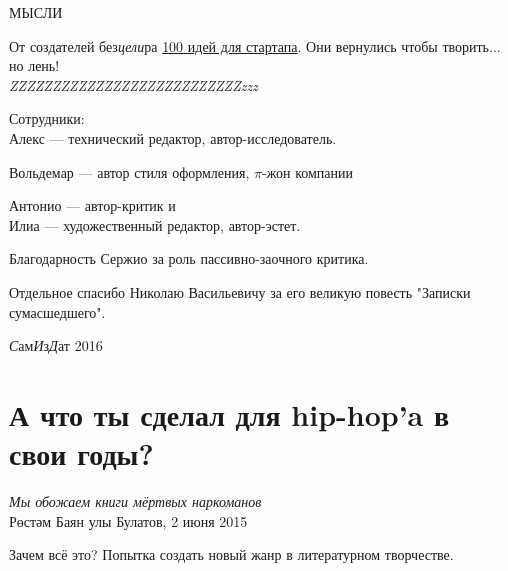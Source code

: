 \documentclass{ideas}
\author{Alive Pine, Inc.}
\begin{document}
\begin{titlepage}

\vspace*{\fill}
\begin{center}
\Huge МЫСЛИ
\end{center}
\vspace*{\fill}
\end{titlepage}

\begin{titlepage}
    От создателей без\emph{цели}ра \href{https://antoniii.github.io/}{100 идей для стартапа}. 
    Они вернулись чтобы творить... но лень!\\

    \emph{\Huge{ZZZ}\LARGE{ZZZ}\Large{ZZZ}\large{ZZZ}ZZZ\small{ZZZ}\footnotesize{ZZZ}\scriptsize{ZZZ}\tiny{ZZZ}\tiny{zzz}}
\end{titlepage}

\begin{center}
\end{center}
\newpage

\begin{center}
Сотрудники:\\
Алекс --- технический редактор, автор-исследователь.\\\vspace{1em}

Вольдемар --- автор стиля оформления, \( \pi\text{-жон} \) компании\\\vspace{1em}

Антонио --- автор-критик и \\Илиа --- художественный редактор, автор-эстет.\\
\end{center}


Благодарность Сержио за роль пассивно-заочного критика.


Отдельное спасибо Николаю Васильевичу за его великую повесть "Записки сумасшедшего".
\vfill
\begin{center}
\textit{С}ам\textit{И}з\textit{Д}ат 2016
\end{center}
\newpage
\section*{А что ты сделал для hip-hop'a в свои годы?}\label{section:one}
\begin{displayquote}
\begin{flushright}
    \textit{Мы обожаем книги мёртвых наркоманов}\\
    Рөстәм Баян улы Булатов, 2 июня 2015
\end{flushright}
\end{displayquote}
Зачем всё это? Попытка создать новый жанр в литературном творчестве.
\end{document}
